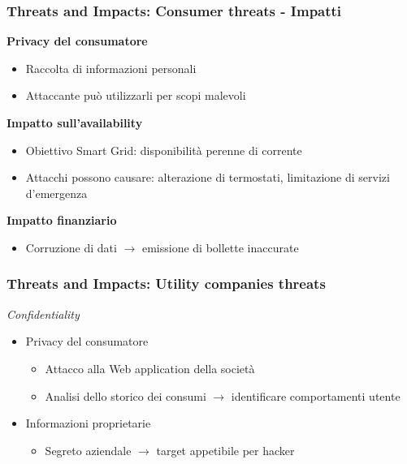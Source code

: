 \begin{frame}
  \frametitle{Threats and Impacts: Consumer threats - Impatti}
	\textbf{Privacy del consumatore}
		\begin{itemize} [<+- | alert@+>]
		\item Raccolta di informazioni personali
		\item Attaccante può utilizzarli per scopi malevoli
		\end{itemize}
	\textbf{Impatto sull'availability}
			\begin{itemize} [<+- | alert@+>]
		\item Obiettivo Smart Grid: disponibilità perenne di corrente
		\item Attacchi possono causare: alterazione di termostati, limitazione di servizi d'emergenza
		\end{itemize}
	\textbf{Impatto finanziario}
				\begin{itemize} [<+- | alert@+>]
		\item Corruzione di dati $\rightarrow$ emissione di bollette inaccurate
		\end{itemize}
\end{frame}

\begin{frame}
  \frametitle{Threats and Impacts: Utility companies threats}
  \textit{Confidentiality}
  \begin{itemize}[<+- | alert@+>]
	  \item Privacy del consumatore
	  \begin{itemize}
	  \item Attacco alla Web application della società 
	  \item Analisi dello storico dei consumi $\rightarrow$ identificare comportamenti utente
	  \end{itemize}
	\item Informazioni proprietarie
		\begin{itemize}
		\item Segreto aziendale $\rightarrow$ target appetibile per hacker
		\end{itemize}
 	\end{itemize}
\end{frame}

